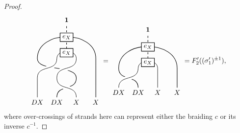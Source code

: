 \documentclass[11pt, reqno]{amsart}
\theoremstyle{definition}\newtheorem{defi}[thm]{Definition}
\theoremstyle{definition}\newtheorem{rem}[thm]{Remark}
\theoremstyle{definition}\newtheorem{exam}[thm]{Example}
\theoremstyle{definition}\newtheorem{assum}[thm]{Assumption}
\newcommand{\vac}{\mathbf{1}}
\begin{document}
\begin{proof}
\begin{align*}
\begin{matrix}
\begin{tikzpicture}[scale = 1, baseline = {(current bounding box.center)}, line width=0.75pt]
        \draw (1,0) .. controls (1,.7) and (2,.3) .. (2,1) .. controls (2,1.7) and (0,1.3) .. (0,2) .. controls (0,3.5) and (3,3.5) .. (3,2) -- (3,0);
        \draw[white, double=black, line width = 3pt ] (0,0) -- (0,1) .. controls (0,1.7) and (1,1.3) .. (1,2) .. controls (1,2.5) and (2,2.5) .. (2,2) .. controls (2,1.3) and (1,1.7) .. (1,1) .. controls (1,.3) and (2,.7) .. (2,0);
        \draw[dashed] (1.5,2.3) -- (1.5,3.75);
              \node at (1.5,2.3) [draw,minimum width=10pt,minimum height=10pt,thick, fill=white] {$e_X$};
      \node at (1.5,3.1) [draw,minimum width=10pt,minimum height=10pt,thick, fill=white] {$e_X$};
      \node at (1.5,4) {$\vac$};
      \node at (0,-.25) {$DX$};
      \node at (1,-.25) {$DX$};
      \node at (2,-.25) {$X$};
      \node at (3,-.25) {$X$};
        \end{tikzpicture}
   \end{matrix} = 
    \begin{matrix}
    \begin{tikzpicture}[scale = 1, baseline = {(current bounding box.center)}, line width=0.75pt]
        \draw (1,0) .. controls (1,.7) and (0,.3) .. (0,1) .. controls (0,2.5) and (3,2.5) .. (3,1) -- (3,0);
        \draw[white, double=black, line width = 3pt ] (0,0) .. controls (0,.7) and (1,.3) .. (1,1) .. controls (1,1.5) and (2,1.5) .. (2,1) -- (2,0);
        \draw[dashed] (1.5,1.3) -- (1.5,2.75);
              \node at (1.5,1.3) [draw,minimum width=10pt,minimum height=10pt,thick, fill=white] {$e_X$};
      \node at (1.5,2.1) [draw,minimum width=10pt,minimum height=10pt,thick, fill=white] {$e_X$};
      \node at (1.5,3) {$\vac$};
      \node at (0,-.25) {$DX$};
      \node at (1,-.25) {$DX$};
      \node at (2,-.25) {$X$};
      \node at (3,-.25) {$X$};
        \end{tikzpicture}
   \end{matrix} = F'_{2}((\sigma'_1)^{\pm 1}),
\end{align*}
where over-crossings of strands here can represent either the braiding $c$ or its inverse $c^{-1}$.
\end{proof}
\end{document}
